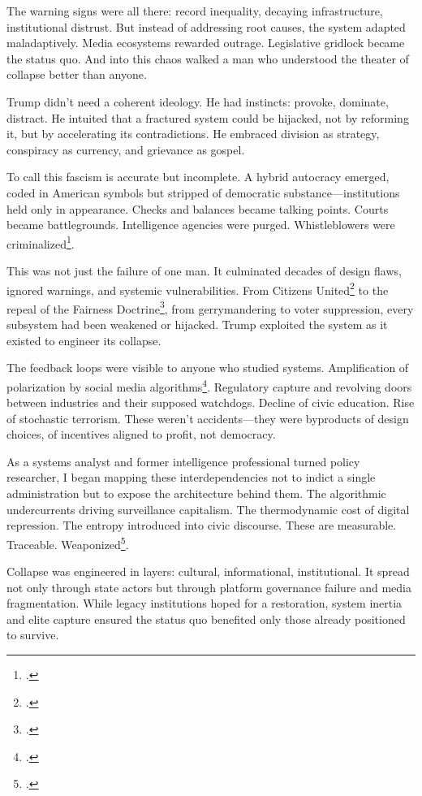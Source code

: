\documentclass[12pt]{book}
\begin{document}
The warning signs were all there: record inequality, decaying infrastructure, institutional distrust. But instead of addressing root causes, the system adapted maladaptively. Media ecosystems rewarded outrage. Legislative gridlock became the status quo. And into this chaos walked a man who understood the theater of collapse better than anyone.

Trump didn't need a coherent ideology. He had instincts: provoke, dominate, distract. He intuited that a fractured system could be hijacked, not by reforming it, but by accelerating its contradictions. He embraced division as strategy, conspiracy as currency, and grievance as gospel.

To call this fascism is accurate but incomplete. A hybrid autocracy emerged, coded in American symbols but stripped of democratic substance—institutions held only in appearance. Checks and balances became talking points. Courts became battlegrounds. Intelligence agencies were purged. Whistleblowers were criminalized\footcite{gellman2020dark}.

This was not just the failure of one man. It culminated decades of design flaws, ignored warnings, and systemic vulnerabilities. From Citizens United\footcite{citizensunitedvfec2010} to the repeal of the Fairness Doctrine\footcite{pickard2019fight}, from gerrymandering to voter suppression, every subsystem had been weakened or hijacked. Trump exploited the system as it existed to engineer its collapse.

The feedback loops were visible to anyone who studied systems. Amplification of polarization by social media algorithms\footcite{tufekci2015algorithmic}. Regulatory capture and revolving doors between industries and their supposed watchdogs. Decline of civic education. Rise of stochastic terrorism. These weren’t accidents—they were byproducts of design choices, of incentives aligned to profit, not democracy.

As a systems analyst and former intelligence professional turned policy researcher, I began mapping these interdependencies not to indict a single administration but to expose the architecture behind them. The algorithmic undercurrents driving surveillance capitalism. The thermodynamic cost of digital repression. The entropy introduced into civic discourse. These are measurable. Traceable. Weaponized\footcite{zuboff2019age}.

Collapse was engineered in layers: cultural, informational, institutional. It spread not only through state actors but through platform governance failure and media fragmentation. While legacy institutions hoped for a restoration, system inertia and elite capture ensured the status quo benefited only those already positioned to survive.
\end{document}
